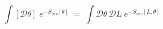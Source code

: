 \begin{equation}\label{eq:defst}
\int [{\mathcal D} \theta ] \; e^{ - S_{inv}[\theta] }
\;=\; \int {\mathcal D}\theta \, {\mathcal D}L \; e^{-S_{inv}[L,\theta]}
\end{equation}

